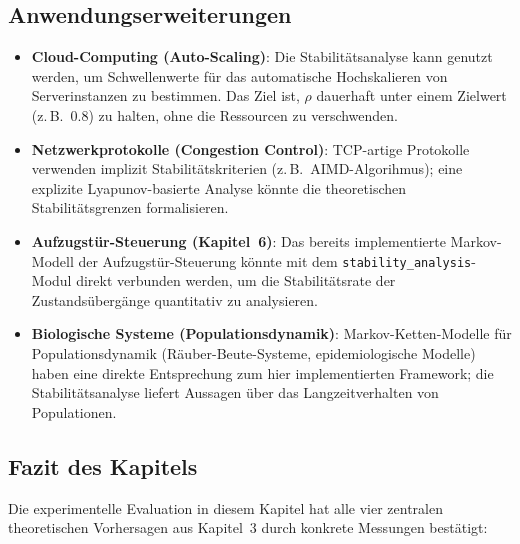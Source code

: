 ﻿\documentclass[a4paper,12pt]{report}
\theoremstyle{definition}
\begin{document}
\subsection{Anwendungserweiterungen}

\begin{itemize}
	\item \textbf{Cloud-Computing (Auto-Scaling)}: Die Stabilitäts\-analyse
	kann genutzt werden, um Schwellenwerte für das automatische
	Hochskalieren von Serverinstanzen zu bestimmen.  Das
	Ziel ist, $\rho$ dauerhaft unter einem Zielwert
	(z.\,B.\ 0.8) zu halten, ohne die Ressourcen zu
	verschwenden.
	
	\item \textbf{Netzwerkprotokolle (Congestion Control)}: TCP-artige
	Protokolle verwenden implizit Stabilitätskriterien (z.\,B.\ 
	AIMD-Algorihmus); eine explizite Lyapunov-basierte Analyse
	könnte die theoretischen Stabilitätsgrenzen formalisieren.
	
	\item \textbf{Aufzugstür-Steuerung (Kapitel~6)}: Das bereits
	implementierte Markov-Modell der Aufzugstür-Steuerung
	könnte mit dem \texttt{stability\_analysis}-Modul
	direkt verbunden werden, um die Stabilitätsrate der
	Zustandsübergänge quantitativ zu analysieren.
	
	\item \textbf{Biologische Systeme (Populationsdynamik)}:
	Markov-Ketten-Modelle für Populationsdynamik
	(Räuber-Beute-Systeme, epidemiologische Modelle) haben
	eine direkte Entsprechung zum hier implementierten Framework;
	die Stabilitätsanalyse liefert Aussagen über das
	Langzeitverhalten von Populationen.
\end{itemize}

\subsection{Fazit des Kapitels}
\label{subsec:fazit-kap8}

Die experimentelle Evaluation in diesem Kapitel hat alle vier
zentralen theoretischen Vorhersagen aus Kapitel~3 durch konkrete
Messungen bestätigt:
\end{document}
